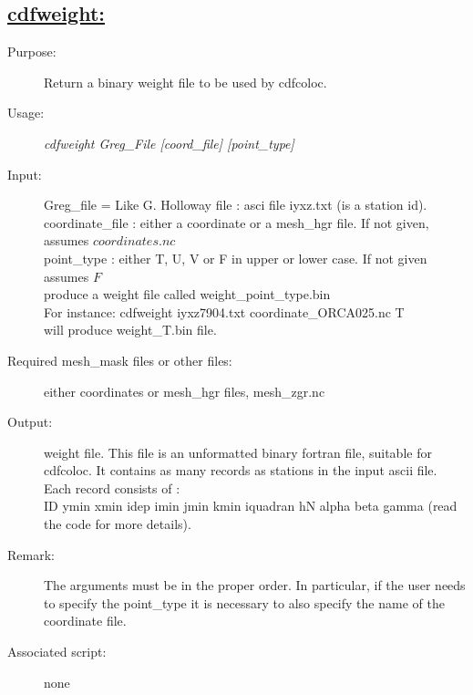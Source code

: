 \documentclass[a4paper,11pt]{article}
\begin{document}
\subsection*{\underline{cdfweight:}}
\begin{description}
\item[Purpose:] Return a binary weight file to be used by cdfcoloc.
\item[Usage:] {\em cdfweight  Greg\_File  [coord\_file] [point\_type]}
\item[Input:] Greg\_file = Like G. Holloway file : asci file iyxz.txt (is a station id). \\
      coordinate\_file : either a coordinate or a mesh\_hgr file. If not given, assumes $coordinates.nc$ \\
      point\_type : either T, U, V or F in upper or lower case. If not given assumes $F$ \\
      produce a weight file called weight\_point\_type.bin \\
For instance: cdfweight  iyxz7904.txt  coordinate\_ORCA025.nc T \\
will produce weight\_T.bin file.
\item[Required mesh\_mask files or other files:] either coordinates or mesh\_hgr files, mesh\_zgr.nc
\item[Output:] weight file.  This file is an unformatted binary fortran file, suitable for cdfcoloc. It contains as
 many records as stations in the input ascii file. Each record consists of :\\
ID ymin xmin idep imin jmin kmin iquadran hN alpha beta gamma (read the code for more details).\\ 
\item[Remark:] The arguments must be in the proper order. In particular, if the user needs to specify the point\_type
it is necessary to also specify the name of the coordinate file.
\item[Associated script:] none
\end{description}
\end{document}
